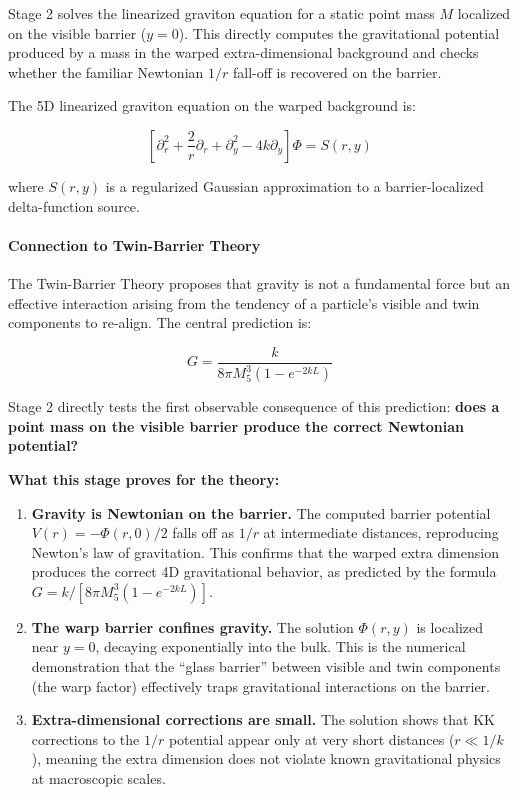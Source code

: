 \documentclass[
  11pt,
]{article}
\begin{document}
Stage 2 solves the linearized graviton equation for a static point mass
\(M\) localized on the visible barrier (\(y = 0\)). This directly
computes the gravitational potential produced by a mass in the warped
extra-dimensional background and checks whether the familiar Newtonian
\(1/r\) fall-off is recovered on the barrier.

The 5D linearized graviton equation on the warped background is:

\[\left[\partial_r^2 + \frac{2}{r}\partial_r + \partial_y^2 - 4k\partial_y\right]\Phi = S(r,y) \tag{106}\]

where \(S(r,y)\) is a regularized Gaussian approximation to a
barrier-localized delta-function source.

\bigskip

\hypertarget{connection-to-twin-barrier-theory-1}{%
\paragraph{Connection to Twin-Barrier
Theory}\label{connection-to-twin-barrier-theory-1}}

The Twin-Barrier Theory proposes that gravity is not a fundamental force
but an effective interaction arising from the tendency of a particle's
visible and twin components to re-align. The central prediction is:

\[G = \frac{k}{8\pi M_5^3(1 - e^{-2kL})} \tag{107}\]

Stage 2 directly tests the first observable consequence of this
prediction: \textbf{does a point mass on the visible barrier produce the
correct Newtonian potential?}

\textbf{What this stage proves for the theory:}

\begin{enumerate}
\def\labelenumi{\arabic{enumi}.}
\item
  \textbf{Gravity is Newtonian on the barrier.} The computed barrier
  potential \(V(r) = -\Phi(r, 0)/2\) falls off as \(1/r\) at
  intermediate distances, reproducing Newton's law of gravitation. This
  confirms that the warped extra dimension produces the correct 4D
  gravitational behavior, as predicted by the formula
  \(G = k/[8\pi M_5^3(1 - e^{-2kL})]\).
\item
  \textbf{The warp barrier confines gravity.} The solution
  \(\Phi(r, y)\) is localized near \(y = 0\), decaying exponentially
  into the bulk. This is the numerical demonstration that the ``glass
  barrier'' between visible and twin components (the warp factor)
  effectively traps gravitational interactions on the barrier.
\item
  \textbf{Extra-dimensional corrections are small.} The solution shows
  that KK corrections to the \(1/r\) potential appear only at very short
  distances (\(r \ll 1/k\)), meaning the extra dimension does not
  violate known gravitational physics at macroscopic scales.
\end{enumerate}
\end{document}
